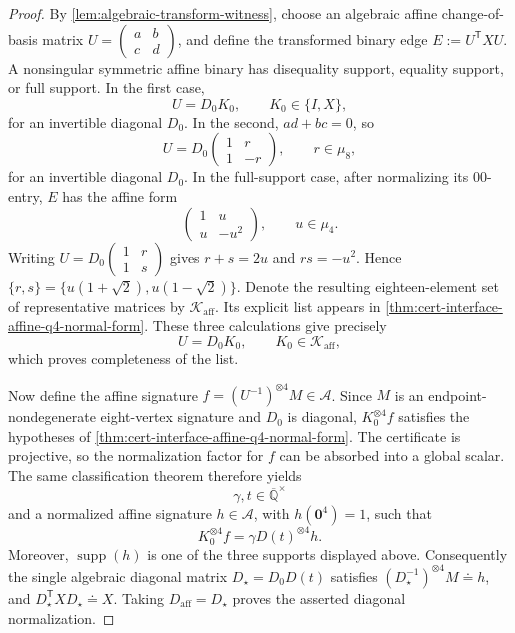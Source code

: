 \documentclass[11pt,letterpaper,onecolumn]{article}
\theoremstyle{plain}
\theoremstyle{definition}
\theoremstyle{remark}
\newcommand{\AlgNums}{\overline{\mathbb Q}}
\newcommand{\cA}{\mathscr A}
\newcommand{\supp}{\operatorname{supp}}
\newcommand{\zero}{\mathbf 0}
\begin{document}
\begin{proof}
By \cref{lem:algebraic-transform-witness}, choose an algebraic affine change-of-basis matrix
\(U=(\begin{smallmatrix}a&b\\c&d\end{smallmatrix})\), and define the
transformed binary edge \(E:=U^{\mathsf T}XU\).  A nonsingular symmetric affine binary has
disequality support, equality support, or full support.  In the first
case,
\[
  U=D_0K_0,\qquad K_0\in\{I,X\},
\]
for an invertible diagonal \(D_0\).
In the second, \(ad+bc=0\), so
\[
 U=D_0\begin{pmatrix}1&r\\1&-r\end{pmatrix},
 \qquad r\in\mu_8,
\]
for an invertible diagonal \(D_0\).  In the full-support case, after
normalizing its \(00\)-entry, \(E\) has the affine form
\[
 \begin{pmatrix}1&u\\u&-u^2\end{pmatrix},
 \qquad u\in\mu_4.
\]
Writing \(U=D_0(\begin{smallmatrix}1&r\\1&s\end{smallmatrix})\) gives
\(r+s=2u\) and \(rs=-u^2\). Hence
\(\{r,s\}=\{u(1+\sqrt2),u(1-\sqrt2)\}\).
Denote the resulting eighteen-element set of representative matrices by
\(\mathscr K_{\mathrm{aff}}\). Its explicit list appears in
\cref{thm:cert-interface-affine-q4-normal-form}.  These three calculations give precisely
\[
 U=D_0K_0,\qquad K_0\in\mathscr K_{\mathrm{aff}},
\]
which proves completeness of the list.

Now define the affine signature \(f=(U^{-1})^{\otimes4}M\in\cA\).  Since
\(M\) is an endpoint-nondegenerate eight-vertex signature and \(D_0\)
is diagonal, \(K_0^{\otimes4}f\) satisfies the hypotheses of
\cref{thm:cert-interface-affine-q4-normal-form}.  The certificate is projective, so the
normalization factor for \(f\) can be absorbed into a global scalar.
The same classification theorem therefore yields
\[
  \gamma,t\in\AlgNums^\times
\]
and a normalized affine signature \(h\in\cA\), with
\(h(\zero^4)=1\), such that
\[
 K_0^{\otimes4}f
 =\gamma D(t)^{\otimes4}h.
\]
Moreover, \(\supp(h)\) is one of the three supports displayed above.
Consequently the
single algebraic diagonal matrix \(D_\star=D_0D(t)\) satisfies
\((D_\star^{-1})^{\otimes4}M\doteq h\), and
\(D_\star^{\mathsf T}XD_\star\doteq X\).  Taking
\(D_{\mathrm{aff}}=D_\star\) proves the asserted diagonal
normalization.
\end{proof}
\end{document}
